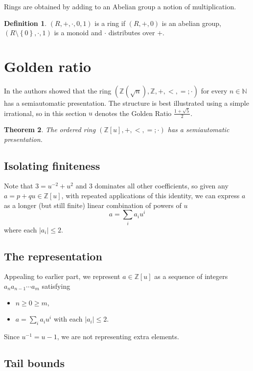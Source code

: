 \documentclass[british,a4paper,11pt,abstract=on]{scrreprt}
\newtheorem{theorem}{Theorem}
\theoremstyle{definition}
\newtheorem{definition}[theorem]{Definition}
\theoremstyle{remark}
\newcommand{\set}[1]{\left\{ #1 \right\}}
\newcommand{\abs}[1]{\left\lvert #1 \right\rvert}
\newcommand{\N}{\mathbb{N}}
\newcommand{\Z}{\mathbb{Z}}
\begin{document}
Rings are obtained by adding to an Abelian group a notion of multiplication.
\begin{definition}
    \((R,+,\cdot,0,1)\) is a ring if \((R,+,0)\) is an abelian group, \((R\setminus\set{0}, \cdot, 1)\) is a monoid and \(\cdot\) distributes over \(+\).
\end{definition}

\section{Golden ratio}

In \autocite{semiauto} the authors showed that the ring \((\Z(\sqrt{n}), \Z, +, <, =;\cdot)\) for every \(n\in\N\) has a semiautomatic presentation.
The structure is best illustrated using a simple irrational, so in this section \(u\) denotes the Golden Ratio \(\frac{1+\sqrt{5}}{2}\).

\begin{theorem}
    The ordered ring \((\Z[u], +, <, =;\cdot)\) has a semiautomatic presentation.
\end{theorem}

\subsection{Isolating finiteness}

Note that \(3 = u^{-2} + u^2\) and \(3\) dominates all other coefficients,
so given any \(a = p + qu \in \Z[u]\), with repeated applications of this identity,
we can express \(a\) as a longer (but still finite) linear combination of powers of \(u\)
\[ a = \sum_i a_i u^i \] where each \(\abs{a_i} \leq 2\).

\subsection{The representation}

Appealing to earlier part, we represent \(a\in\Z[u]\) as a sequence of integers \(a_na_{n-1}\cdots a_m\) satisfying
\begin{itemize}
    \item \(n \geq 0 \geq m\),
    \item \( a = \sum_i a_i u^i \) with each \(\abs{a_i} \leq 2\).
\end{itemize}
Since \(u^{-1} = u - 1\), we are not representing extra elements.

\subsection{Tail bounds}
\end{document}
